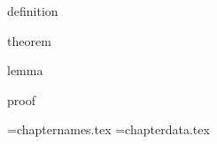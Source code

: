
\newif\ifInBook \InBooktrue
\let\textbookref\ref

\newcommand\slidenewline{}\let\slidebreak\slidenewline


\newenvironment
    {remark}
    {\textbf{Remark}~\slshape\ignorespaces}{}
\expandafter\ifx\csname definition\endcsname\relax
    \newtheorem{definition}{Definition}
\fi
\expandafter\ifx\csname theorem\endcsname\relax
    \newtheorem{theorem}{Theorem}
\fi
\expandafter\ifx\csname lemma\endcsname\relax
    \newtheorem{lemma}{Lemma}
\fi
\expandafter\ifx\csname proof\endcsname\relax
 \newenvironment{proof}{\begin{quotation}\small\sl\noindent Proof.\ \ignorespaces}
     {\end{quotation}}
\fi


\newwrite\nx
\ifFormatAsBook
  \newwrite\chapterlist \openout\chapterlist=chapternames.tex
  \newwrite\chapterdata \openout\chapterdata=chapterdata.tex
\fi

